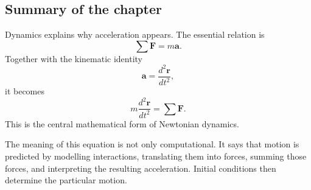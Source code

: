 \subsection{Summary of the chapter}

Dynamics explains why acceleration appears. The essential relation is
\[
\boxed{\sum \mathbf{F}=m\mathbf{a}}.
\]
Together with the kinematic identity
\[
\mathbf{a}=\frac{d^2\mathbf{r}}{dt^2},
\]
it becomes
\[
\boxed{m\frac{d^2\mathbf{r}}{dt^2}=\sum \mathbf{F}}.
\]
This is the central mathematical form of Newtonian dynamics.

The meaning of this equation is not only computational. It says that motion is predicted by modelling interactions, translating them into forces, summing those forces, and interpreting the resulting acceleration. Initial conditions then determine the particular motion.
